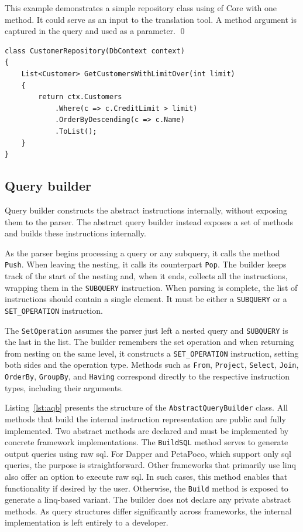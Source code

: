 \begin{example}
\small
This example demonstrates a simple repository class using \acrshort{ef} Core with one method. 
It could serve as an input to the translation tool. A method argument is captured in the query and used as a parameter.
\qed
\begin{lstlisting}[language=CSharp]
class CustomerRepository(DbContext context)
{
    List<Customer> GetCustomersWithLimitOver(int limit)
    {
        return ctx.Customers
            .Where(c => c.CreditLimit > limit)
            .OrderByDescending(c => c.Name)
            .ToList();
    }
}
\end{lstlisting}
\end{example}

\subsection{Query builder}

Query builder constructs the abstract instructions internally, without exposing them to the parser. The abstract query builder instead exposes a set of methods and builds these instructions internally.

As the parser begins processing a query or any subquery, it calls the method \texttt{Push}. When leaving the nesting, it calls its counterpart \texttt{Pop}. The builder keeps track of the start of the nesting and, when it ends, collects all the instructions, wrapping them in the \texttt{SUBQUERY} instruction. When parsing is complete, the list of instructions should contain a single element. It must be either a \texttt{SUBQUERY} or a \texttt{SET\_OPERATION} instruction.

The \texttt{SetOperation} assumes the parser just left a nested query and \texttt{SUBQUERY} is the last in the list. The builder remembers the set operation and when returning from nesting on the same level, it constructs a \texttt{SET\_OPERATION} instruction, setting both sides and the operation type.
Methods such as \texttt{From}, \texttt{Project}, \texttt{Select}, \texttt{Join}, \texttt{OrderBy}, \texttt{GroupBy}, and \texttt{Having} correspond directly to the respective instruction types, including their arguments. 

Listing~\ref{lst:aqb} presents the structure of the \texttt{AbstractQueryBuilder} class. All methods that build the internal instruction representation are public and fully implemented. Two abstract methods are declared and must be implemented by concrete framework implementations. The \texttt{BuildSQL} method serves to generate output queries using raw \acrshort{sql}. For Dapper and PetaPoco, which support only \acrshort{sql} queries, the purpose is straightforward. Other frameworks that primarily use \acrshort{linq} also offer an option to execute raw \acrshort{sql}. In such cases, this method enables that functionality if desired by the user. Otherwise, the \texttt{Build} method is exposed to generate a \acrshort{linq}-based variant. The builder does not declare any private abstract methods. As query structures differ significantly across frameworks, the internal implementation is left entirely to a developer.

